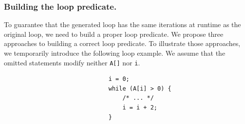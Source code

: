 \documentclass[12pt]{gatech-thesis}
\begin{document}

\subsubsection{Building the loop predicate.}

To guarantee that the generated loop has the same iterations at runtime as the original loop, we need to build a proper loop predicate. 
We propose three approaches to building a correct loop predicate. 
To illustrate those approaches, we temporarily introduce the following loop example. We assume that the omitted statements  modify neither \texttt{A[]} nor \texttt{i}.
\small
\begin{verbatim}
                              i = 0;
                              while (A[i] > 0) {
                                  /* ... */
                                  i = i + 2;
                              }
\end{verbatim}
\normalsize
\end{document}
